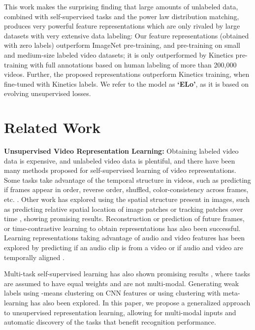 \documentclass[10pt,twocolumn,letterpaper]{article}
\begin{document}
This work makes the surprising finding that large amounts of unlabeled data, combined with self-supervised tasks and the power law distribution matching, produces very powerful feature representations which are only rivaled by large datasets with very extensive data labeling: Our feature representations (obtained with zero labels) outperform ImageNet pre-training, and pre-training on small and medium-size labeled video datasets; it is only outperformed by Kinetics pre-training with full annotations based on human labeling of more than 200,000 videos. 
Further, the proposed representations outperform Kinetics training, when fine-tuned with Kinetics labels. 
We refer to the model as \textbf{`ELo'}, as it is based on evolving unsupervised losses.




\section{Related Work}

\textbf{Unsupervised Video Representation Learning:} Obtaining labeled video data is expensive, and unlabeled video data is plentiful, and there have been many methods proposed for self-supervised learning of video representations. Some tasks take advantage of the temporal structure in videos, such as predicting if frames appear in order, reverse order, shuffled, color-consistency across frames, etc. \cite{fernando2017self, misra2016shuffle, isola2015learning, lee2017unsupervised,pickup2014seeing,wei2018learning,jayaraman2016slow,kim2018self,wang2017transitive,wang2019learning,vondrick2018tracking}. Other work has explored using the spatial structure present in images, such as predicting relative spatial location of image patches \cite{noroozi2016unsupervised} or tracking patches over time \cite{wang2015unsupervised}, showing promising results. Reconstruction or prediction of future frames\cite{srivastava2015unsupervised}, or time-contrastive learning\cite{timecontrastive,sermanet2017time} to obtain representations has also been successful. Learning representations taking advantage of audio and video features has been explored by predicting if an audio clip is from a video \cite{arandjelovic2017look} or if audio and video are temporally aligned \cite{owens2018audio,chung2016out,korbar2018cooperative,Arandjelovic2018objects}.

Multi-task self-supervised learning has also shown promising results \cite{doersch2017multi,ren2018cross,zamir2018taskonomy}, where tasks are assumed to have equal weights and are not multi-modal.
Generating weak labels using -means clustering on CNN features \cite{bautista2016cliquecnn,caron2018deep} or using clustering with meta-learning \cite{hsu2018unsupervised} has also been explored.
In this paper, we propose a generalized approach to unsupervised representation learning, allowing for multi-modal inputs and automatic discovery of the tasks that benefit recognition performance.
\end{document}
